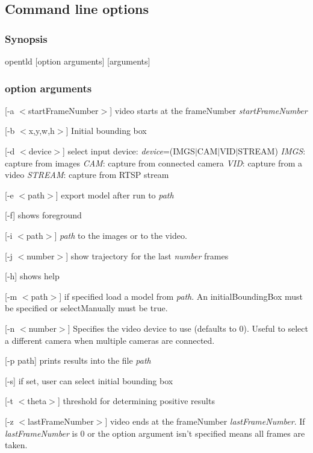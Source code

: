 \subsection*{Command line options}

\subsubsection*{Synopsis}

{\ttfamily opentld \mbox{[}option arguments\mbox{]} \mbox{[}arguments\mbox{]}}

\subsubsection*{option arguments}


\begin{DoxyItemize}
\item {\ttfamily \mbox{[}-\/a $<$start\-Frame\-Number$>$\mbox{]}} video starts at the frame\-Number {\itshape start\-Frame\-Number}
\item {\ttfamily \mbox{[}-\/b $<$x,y,w,h$>$\mbox{]}} Initial bounding box
\item {\ttfamily \mbox{[}-\/d $<$device$>$\mbox{]}} select input device\-: {\itshape device}=(I\-M\-G\-S$\vert$\-C\-A\-M$\vert$\-V\-I\-D$\vert$\-S\-T\-R\-E\-A\-M) {\itshape I\-M\-G\-S}\-: capture from images {\itshape C\-A\-M}\-: capture from connected camera {\itshape V\-I\-D}\-: capture from a video {\itshape S\-T\-R\-E\-A\-M}\-: capture from R\-T\-S\-P stream
\item {\ttfamily \mbox{[}-\/e $<$path$>$\mbox{]}} export model after run to {\itshape path}
\item {\ttfamily \mbox{[}-\/f\mbox{]}} shows foreground
\item {\ttfamily \mbox{[}-\/i $<$path$>$\mbox{]}} {\itshape path} to the images or to the video.
\item {\ttfamily \mbox{[}-\/j $<$number$>$\mbox{]}} show trajectory for the last {\itshape number} frames
\item {\ttfamily \mbox{[}-\/h\mbox{]}} shows help
\item {\ttfamily \mbox{[}-\/m $<$path$>$\mbox{]}} if specified load a model from {\itshape path}. An initial\-Bounding\-Box must be specified or select\-Manually must be true.
\item {\ttfamily \mbox{[}-\/n $<$number$>$\mbox{]}} Specifies the video device to use (defaults to 0). Useful to select a different camera when multiple cameras are connected.
\item {\ttfamily \mbox{[}-\/p path\mbox{]}} prints results into the file {\itshape path}
\item {\ttfamily \mbox{[}-\/s\mbox{]}} if set, user can select initial bounding box
\item {\ttfamily \mbox{[}-\/t $<$theta$>$\mbox{]}} threshold for determining positive results
\item {\ttfamily \mbox{[}-\/z $<$last\-Frame\-Number$>$\mbox{]}} video ends at the frame\-Number {\itshape last\-Frame\-Number}. If {\itshape last\-Frame\-Number} is 0 or the option argument isn't specified means all frames are taken.
\end{DoxyItemize}

